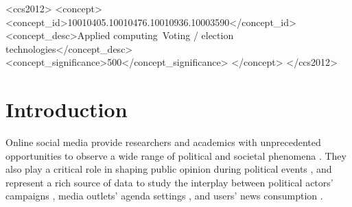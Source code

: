 \documentclass[sigconf,screen]{acmart}
\begin{document}
\begin{CCSXML}
<ccs2012>
   <concept>
       <concept_id>10010405.10010476.10010936.10003590</concept_id>
       <concept_desc>Applied computing~Voting / election technologies</concept_desc>
       <concept_significance>500</concept_significance>
       </concept>
 </ccs2012>
\end{CCSXML}








\maketitle

\section{Introduction}
Online social media provide researchers and academics with unprecedented opportunities to observe a wide range of political and societal phenomena \cite{rossi2021nearly}. They also play a critical role in shaping public opinion during political events \cite{vitak2011s}, and represent a rich source of data to study the interplay between political actors’ campaigns \cite{sahly2019social}, media outlets’ agenda settings \cite{kim2016first}, and users’ news consumption \cite{allcott2017social}. 
\end{document}
